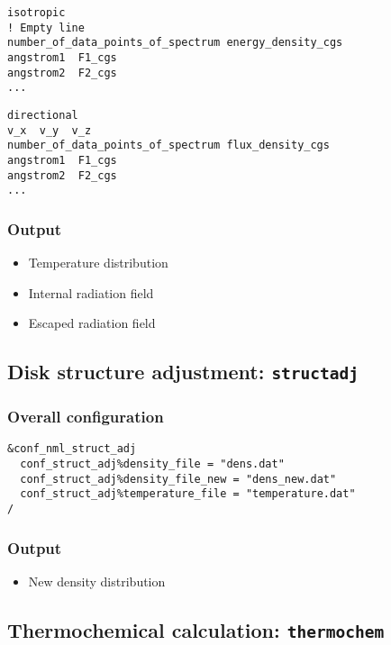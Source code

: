 \documentclass{article}
\newcommand{\structadj}{\texttt{structadj}}
\newcommand{\thermochem}{\texttt{thermochem}}
\begin{document}
\begin{lstlisting}
isotropic
! Empty line
number_of_data_points_of_spectrum energy_density_cgs
angstrom1  F1_cgs
angstrom2  F2_cgs
...
\end{lstlisting}

\begin{lstlisting}
directional
v_x  v_y  v_z
number_of_data_points_of_spectrum flux_density_cgs
angstrom1  F1_cgs
angstrom2  F2_cgs
...
\end{lstlisting}

\subsubsection{Output}

\begin{itemize}
  \item Temperature distribution
  \item Internal radiation field
  \item Escaped radiation field
\end{itemize}  

\subsection{Disk structure adjustment: \structadj}

\subsubsection{Overall configuration}

\begin{lstlisting}
&conf_nml_struct_adj
  conf_struct_adj%density_file = "dens.dat"
  conf_struct_adj%density_file_new = "dens_new.dat"
  conf_struct_adj%temperature_file = "temperature.dat"
/
\end{lstlisting}

\subsubsection{Output}

\begin{itemize}
  \item New density distribution
\end{itemize}  

\subsection{Thermochemical calculation: \thermochem}
\end{document}
